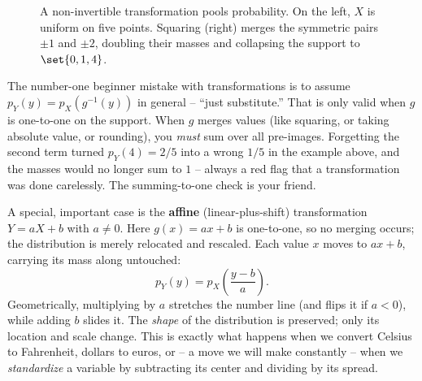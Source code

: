 \begin{figure}[H]
\centering
{}
\caption{A non-invertible transformation pools probability. On the left, $X$ is
uniform on five points. Squaring (right) merges the symmetric pairs $\pm1$ and $\pm2$,
doubling their masses and collapsing the support to $\set{0,1,4}$.}
\label{ch06:fig-square}
\end{figure}

\begin{trapbox}
The number-one beginner mistake with transformations is to assume
$p_Y(y) = p_X(g^{-1}(y))$ in general -- ``just substitute.'' That is only valid when
$g$ is one-to-one on the support. When $g$ merges values (like squaring, or taking
absolute value, or rounding), you \emph{must} sum over all pre-images. Forgetting the
second term turned $p_Y(4) = 2/5$ into a wrong $1/5$ in the example above, and the
masses would no longer sum to $1$ -- always a red flag that a transformation was done
carelessly. The summing-to-one check is your friend.
\end{trapbox}

A special, important case is the \textbf{affine} (linear-plus-shift) transformation
$Y = aX + b$ with $a \ne 0$. Here $g(x) = ax + b$ is one-to-one, so no merging occurs;
the distribution is merely relocated and rescaled. Each value $x$ moves to $ax + b$,
carrying its mass along untouched:
\[
  p_Y(y) = p_X\!\left(\frac{y - b}{a}\right).
\]
Geometrically, multiplying by $a$ stretches the number line (and flips it if $a < 0$),
while adding $b$ slides it. The \emph{shape} of the distribution is preserved; only its
location and scale change. This is exactly what happens when we convert Celsius to
Fahrenheit, dollars to euros, or -- a move we will make constantly -- when we
\emph{standardize} a variable by subtracting its center and dividing by its spread.

